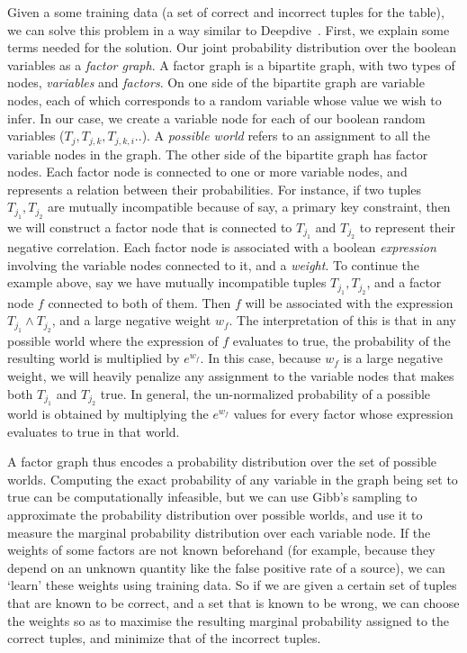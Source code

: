 \documentclass{sig-alternate}
\newcounter{prob}
\begin{document}
Given a some training data (a set of correct and incorrect tuples for the table), we can solve this problem in a way similar to Deepdive~\cite{deepdive,Niu_deepdive:web-scale}. First, we explain some terms needed for the solution. Our joint probability distribution over the boolean variables as a \textit{factor graph}. A factor graph is a bipartite graph, with two types of nodes, \textit{variables} and \textit{factors}. On one side of the bipartite graph are variable nodes, each of which corresponds to a random variable whose value we wish to infer. In our case, we create a variable node for each of our boolean random variables ($T_j, T_{j, k}, T_{j,k,i} ..$). A \textit{possible world} refers to an assignment to all the variable nodes in the graph. The other side of the bipartite graph has factor nodes. Each factor node is connected to one or more variable nodes, and represents a relation between their probabilities. For instance, if two tuples $T_{j_1}, T_{j_2}$ are mutually incompatible because of say, a primary key constraint, then we will construct a factor node that is connected to $T_{j_1}$ and $T_{j_2}$ to represent their negative correlation. Each factor node is associated with a boolean \textit{expression} involving the variable nodes connected to it, and a \textit{weight}. To continue the example above, say we have mutually incompatible tuples $T_{j_1}, T_{j_2}$, and a factor node $f$ connected to both of them. Then $f$ will be associated with the expression $T_{j_1} \land T_{j_2}$, and a large negative weight $w_f$. The interpretation of this is that in any possible world where the expression of $f$ evaluates to true, the probability of the resulting world is multiplied by $e^{w_f}$. In this case, because $w_f$ is a large negative weight, we will heavily penalize any assignment to the variable nodes that makes both $T_{j_1}$ and $T_{j_2}$ true. In general, the un-normalized probability of a possible world is obtained by multiplying the $e^{w_f}$ values for every factor whose expression evaluates to true in that world.

A factor graph thus encodes a probability distribution over the set of possible worlds. Computing the exact probability of any variable in the graph being set to true can be computationally infeasible, but we can use Gibb's sampling to approximate the probability distribution over possible worlds, and use it to measure the marginal probability distribution over each variable node. If the weights of some factors are not known beforehand (for example, because they depend on an unknown quantity like the false positive rate of a source), we can `learn' these weights using training data. So if we are given a certain set of tuples that are known to be correct, and a set that is known to be wrong, we can choose the weights so as to maximise the resulting marginal probability assigned to the correct tuples, and minimize that of the incorrect tuples. 
\end{document}
